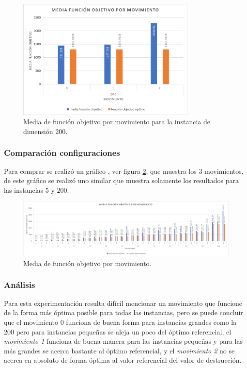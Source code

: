 \begin{figure}[!ht]
    \centering
    \includegraphics[width=0.8\textwidth]{images/testing/media_por_movimiento_200.png}
    \caption{Media de función objetivo por movimiento para la instancia de dimensión 200.}
    \label{graph:movements_200}
\end{figure}

\subsubsection{Comparación configuraciones}

Para comprar se realizó un gráfico , ver figura \ref{graph:movements}, que muestra los 3 movimientos, de este gráfico se realizó uno similar que muestra solamente los resultados para las instancias $5$ y $200$. 

\begin{figure}[!ht]
    \centering
    \includegraphics[width=\textwidth]{images/testing/media_por_movimiento.png}
    \caption{Media de función objetivo por movimiento.}
    \label{graph:movements}
\end{figure}

\subsubsection{Análisis}

Para esta experimentación resulta difícil mencionar un movimiento que funcione de la forma más óptima posible para todas las instancias, pero se puede concluir que el movimiento 0 funciona de buena forma para instancias grandes como la 200 pero para instancias pequeñas se aleja un poco del óptimo referencial, el \textit{movimiento 1} funciona de buena manera para las instancias pequeñas y para las más grandes se acerca bastante al óptimo referencial, y el \textit{movimiento 2} no se acerca en absoluto de forma óptima al valor referencial del valor de destrucción.


